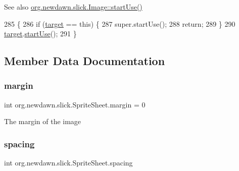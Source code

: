 \begin{DoxySeeAlso}{See also}
\mbox{\hyperlink{classorg_1_1newdawn_1_1slick_1_1_image_a6c7c3f31d0a0a4c73026c8dac8dec7d2}{org.\+newdawn.\+slick.\+Image\+::start\+Use()}} 
\end{DoxySeeAlso}

\begin{DoxyCode}
285                            \{
286         \textcolor{keywordflow}{if} (\mbox{\hyperlink{classorg_1_1newdawn_1_1slick_1_1_sprite_sheet_a54e0b09e9140db02bc11ac22fff5d464}{target}} == \textcolor{keyword}{this}) \{
287             super.startUse();
288             \textcolor{keywordflow}{return};
289         \}
290         \mbox{\hyperlink{classorg_1_1newdawn_1_1slick_1_1_sprite_sheet_a54e0b09e9140db02bc11ac22fff5d464}{target}}.\mbox{\hyperlink{classorg_1_1newdawn_1_1slick_1_1_image_a6c7c3f31d0a0a4c73026c8dac8dec7d2}{startUse}}();
291     \}
\end{DoxyCode}


\subsection{Member Data Documentation}
\mbox{\label{classorg_1_1newdawn_1_1slick_1_1_sprite_sheet_a971a0145bb69e5bf2ae0432b7f2a69f5}} 
\subsubsection{\texorpdfstring{margin}{margin}}
{\footnotesize\ttfamily int org.\+newdawn.\+slick.\+Sprite\+Sheet.\+margin = 0\hspace{0.3cm}{\ttfamily [private]}}

The margin of the image \mbox{\label{classorg_1_1newdawn_1_1slick_1_1_sprite_sheet_acfe40394e52d34270bc42e936472b5a6}} 
\subsubsection{\texorpdfstring{spacing}{spacing}}
{\footnotesize\ttfamily int org.\+newdawn.\+slick.\+Sprite\+Sheet.\+spacing\hspace{0.3cm}{\ttfamily [private]}}

